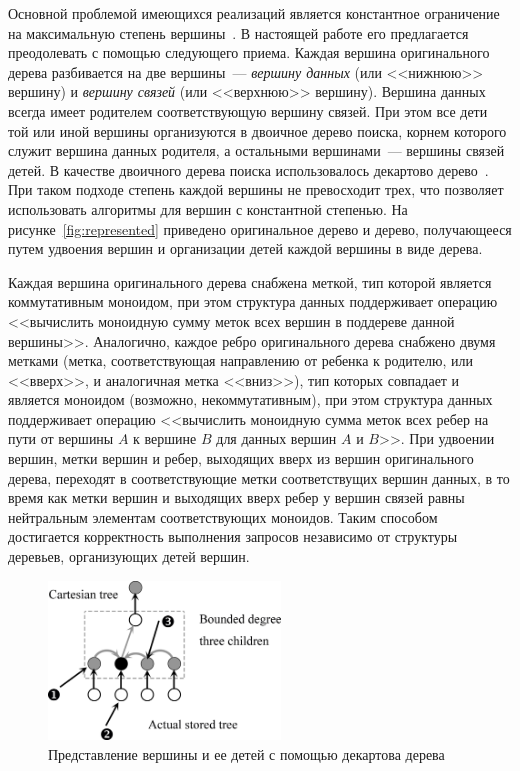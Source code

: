 \documentclass[specification,annotation,times]{itmo-student-thesis}
\begin{document}
Основной проблемой имеющихся реализаций является константное ограничение на максимальную степень вершины~\cite{acar04}. В настоящей работе его предлагается преодолевать
с помощью следующего приема. Каждая вершина оригинального дерева разбивается на две вершины~--- \emph{вершину данных} (или <<нижнюю>> вершину) и \emph{вершину связей} (или <<верхнюю>> вершину).
Вершина данных всегда имеет родителем соответствующую вершину связей. При этом все дети той или иной вершины организуются в двоичное дерево поиска, корнем которого служит вершина данных родителя, а
остальными вершинами~--- вершины связей детей. В качестве двоичного дерева поиска использовалось декартово дерево~\cite{cartesian-tree}. При таком подходе степень каждой вершины не превосходит трех, что
позволяет использовать алгоритмы для вершин с константной степенью. На рисунке~\ref{fig:represented} приведено оригинальное дерево и дерево, получающееся путем удвоения вершин и организации детей каждой
вершины в виде дерева.

Каждая вершина оригинального дерева снабжена меткой, тип которой является коммутативным моноидом, при этом структура данных поддерживает операцию <<вычислить моноидную сумму меток всех вершин в поддереве
данной вершины>>. Аналогично, каждое ребро оригинального дерева снабжено двумя метками (метка, соответствующая направлению от ребенка к родителю, или <<вверх>>, и аналогичная метка <<вниз>>),
тип которых совпадает и является моноидом (возможно, некоммутативным), при этом структура данных поддерживает операцию <<вычислить моноидную сумма меток всех ребер на пути от вершины $A$
к вершине $B$ для данных вершин $A$ и $B$>>. При удвоении вершин, метки вершин и ребер, выходящих вверх из вершин оригинального дерева, переходят в соответствующие метки соответствущих вершин данных,
в то время как метки вершин и выходящих вверх ребер у вершин связей равны нейтральным элементам соответствующих моноидов. Таким способом достигается корректность выполнения запросов независимо от
структуры деревьев, организующих детей вершин.

\begin{figure}[!ht]
\centering
\includegraphics[width=0.55\textwidth]{pic/Cartesian_tree.png}
\caption{Представление вершины и ее детей с помощью декартова дерева}\label{fig:cartesian-children}
\end{figure}
\end{document}
